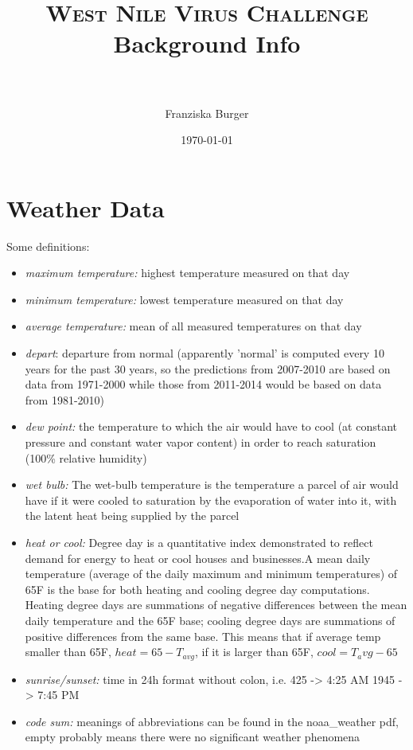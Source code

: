 \documentclass[a4, 12pt]{article}
\title{
\normalfont \normalsize 
\textsc{West Nile Virus Challenge} \\ [25pt] 
\Large Background Info\\ 
\horrule{2pt} \\[0.5cm]
}
\author{
    Franziska Burger
}
\date{\today}
\begin{document}
\maketitle

{}
\setcounter{page}{1}

\section{Weather Data}
Some definitions:
\begin{itemize}
\item \emph{maximum temperature:} highest temperature measured on that day
\item \emph{minimum temperature:} lowest temperature measured on that day
\item \emph{average temperature:} mean of all measured temperatures on that day
\item \emph{depart}: departure from normal (apparently 'normal' is computed every 10 years for the past 30 years, so the predictions from 2007-2010 are based on data from 1971-2000 while those from 2011-2014 would be based on data from 1981-2010)
\item \emph{dew point:} the temperature to which the air would have to cool (at constant pressure and constant water vapor content) in order to reach saturation (100\% relative humidity)
\item \emph{wet bulb:} The wet-bulb temperature is the temperature a parcel of air would have if it were cooled to saturation by the evaporation of water into it, with the latent heat being supplied by the parcel
\item \emph{heat or cool:} Degree day is a quantitative index demonstrated to reflect demand for energy to heat or cool houses and businesses.A mean daily temperature (average of the daily maximum and minimum temperatures) of 65\degree F is the base for both heating and cooling degree day computations. Heating degree days are summations of negative differences between the mean daily temperature and the 65\degree F base; cooling degree days are summations of positive differences from the same base. This means that if average temp smaller than 65\degree F, $heat = 65- T_{avg}$, if it is larger than 65\degree F, $cool = T_avg - 65$
\item \emph{sunrise/sunset:} time in 24h format without colon, i.e. 425 -> 4:25 AM 1945 -> 7:45 PM
\item \emph{code sum:} meanings of abbreviations can be found in the noaa\_weather pdf, empty probably means there were no significant weather phenomena

\end{itemize}
\end{document}
